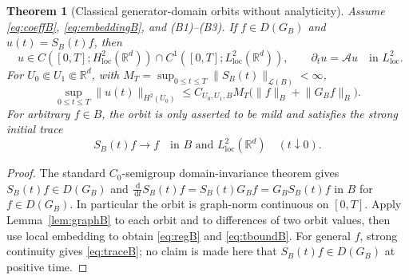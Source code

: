 \documentclass[11pt,a4paper]{article}
\newtheorem{theorem}{Theorem}[section]
\theoremstyle{definition}\newtheorem{definition}{Definition}[section]\newtheorem{example}[theorem]{Example}
\theoremstyle{remark}\newtheorem{remark}[theorem]{Remark}\newtheorem{remarkSix}{Remark}[section]
\newcommand{\Rd}{\mathbb R^d}
\newcommand{\loc}{\mathrm{loc}}
\newcommand{\dd}{\,\mathrm d}
\newcommand{\norm}[1]{\lVert #1\rVert}
\newcommand{\cA}{\mathcal A}
\begin{document}
\begin{theorem}[Classical generator-domain orbits without analyticity]\label{thm:classicalB}
Assume \eqref{eq:coeffB}, \eqref{eq:embeddingB}, and (B1)--(B3). If $f\in D(G_B)$ and $u(t)=S_B(t)f$, then
\begin{equation}\label{eq:regB}
\boxed{\quad u\in C([0,T];H^2_{\loc}(\Rd))\cap C^1([0,T];L^2_{\loc}(\Rd)),
\qquad \partial_tu=\cA u\quad\text{in }L^2_{\loc}.\quad}
\end{equation}
For $U_0\Subset U_1\Subset\Rd$, with $M_T=\sup_{0\le t\le T}\norm{S_B(t)}_{\mathcal L(B)}<\infty$,
\begin{equation}\label{eq:tboundB}
 \sup_{0\le t\le T}\norm{u(t)}_{H^2(U_0)}
 \le C_{U_0,U_1,B}M_T\bigl(\norm f_B+\norm{G_Bf}_B\bigr).
\end{equation}
For \emph{arbitrary} $f\in B$, the orbit is only asserted to be mild and satisfies the strong initial trace
\begin{equation}\label{eq:traceB}
 S_B(t)f\longrightarrow f\quad\text{in }B\text{ and }L^2_{\loc}(\Rd)\quad(t\downarrow0).
\end{equation}
\end{theorem}
\begin{proof}
The standard $C_0$-semigroup domain-invariance theorem gives $S_B(t)f\in D(G_B)$ and
$\frac{\dd}{\dd t}S_B(t)f=S_B(t)G_Bf=G_BS_B(t)f$ in $B$ for $f\in D(G_B)$. In particular the orbit is graph-norm continuous on $[0,T]$. Apply Lemma~\ref{lem:graphB} to each orbit and to differences of two orbit values, then use local embedding to obtain \eqref{eq:regB} and \eqref{eq:tboundB}. For general $f$, strong continuity gives \eqref{eq:traceB}; no claim is made here that $S_B(t)f\in D(G_B)$ at positive time.
\end{proof}
\end{document}
